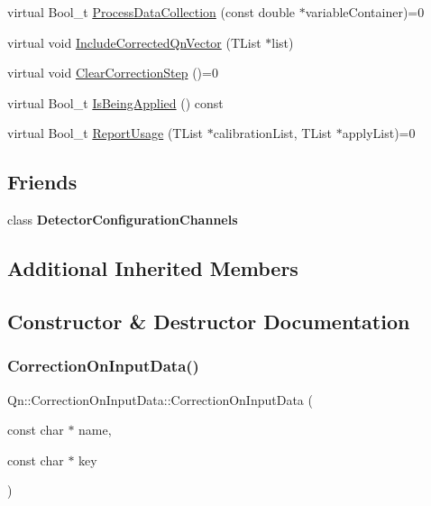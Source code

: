 \begin{DoxyCompactItemize}
\item 
virtual Bool\+\_\+t \mbox{\hyperlink{classQn_1_1CorrectionOnInputData_aff000eb0dbd571ac42eb0c4d3771ba69}{Process\+Data\+Collection}} (const double $\ast$variable\+Container)=0
\item 
virtual void \mbox{\hyperlink{classQn_1_1CorrectionOnInputData_a9072c5ffae945c464bed4ee3e60858a4}{Include\+Corrected\+Qn\+Vector}} (T\+List $\ast$list)
\item 
virtual void \mbox{\hyperlink{classQn_1_1CorrectionOnInputData_a8da92a3389c8654961199f123d5e6a6d}{Clear\+Correction\+Step}} ()=0
\item 
virtual Bool\+\_\+t \mbox{\hyperlink{classQn_1_1CorrectionOnInputData_a738e13f0a496811358ad3f5b86320ffa}{Is\+Being\+Applied}} () const
\item 
virtual Bool\+\_\+t \mbox{\hyperlink{classQn_1_1CorrectionOnInputData_a40b05b6db47e8dd52e1f6a616b9b9d3a}{Report\+Usage}} (T\+List $\ast$calibration\+List, T\+List $\ast$apply\+List)=0
\end{DoxyCompactItemize}
\subsection*{Friends}
\begin{DoxyCompactItemize}
\item 
\mbox{\label{classQn_1_1CorrectionOnInputData_a0c85055b2faa6f776e4c3c0367a16417}} 
class {\bfseries Detector\+Configuration\+Channels}
\end{DoxyCompactItemize}
\subsection*{Additional Inherited Members}


\subsection{Constructor \& Destructor Documentation}
\mbox{\label{classQn_1_1CorrectionOnInputData_a519a4d9222892b586efa89bb47cd46e8}} 
\subsubsection{\texorpdfstring{Correction\+On\+Input\+Data()}{CorrectionOnInputData()}}
{\footnotesize\ttfamily Qn\+::\+Correction\+On\+Input\+Data\+::\+Correction\+On\+Input\+Data (\begin{DoxyParamCaption}\item[{const char $\ast$}]{name,  }\item[{const char $\ast$}]{key }\end{DoxyParamCaption})}

